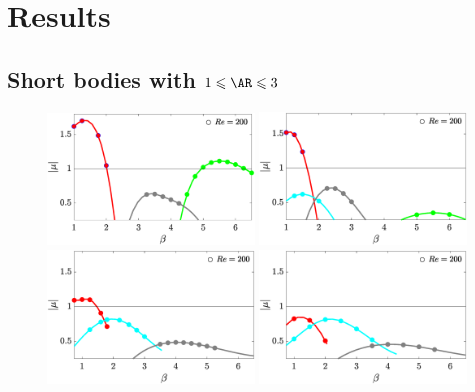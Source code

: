 \documentclass{jfm}
\begin{document}
\section{Results}

\subsection{Short bodies with $1 \le \AR \le 3$}

\begin{figure}
  \centering
  \includegraphics[width=0.49\textwidth]{./fig/AR1s/multipliers_AR1.eps}
  \includegraphics[width=0.49\textwidth]{./fig/AR1s/multipliers_AR1p25.eps}
  \includegraphics[width=0.49\textwidth]{./fig/AR1s/multipliers_AR1p5.eps}
  \includegraphics[width=0.49\textwidth]{./fig/AR1s/multipliers_AR1p75.eps} \\

\end{figure}
\end{document}
